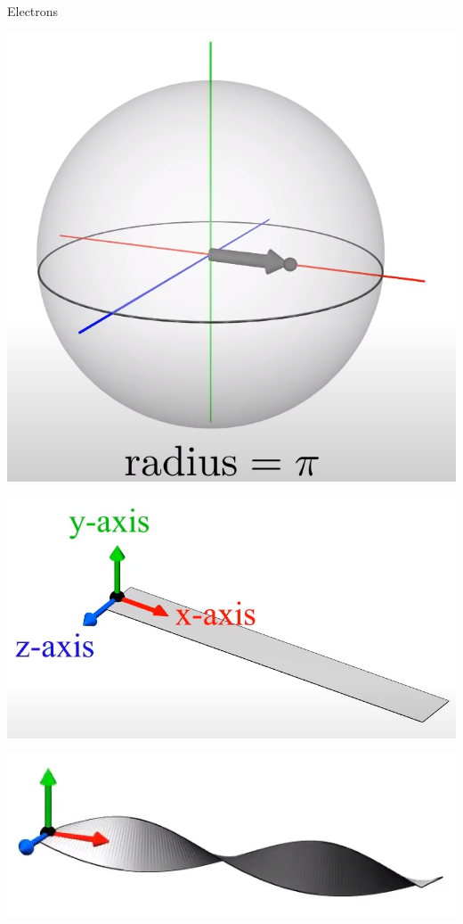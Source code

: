 \documentclass[10pt]{beamer}
\begin{document}

\begin{frame}{Electrons}
\end{frame}

\begin{frame}

    \includegraphics[scale=0.1]{Pictures/SO3sphere.png}

    \includegraphics[scale=0.1]{Pictures/beltaxis.png}

    \includegraphics[scale=0.1]{Pictures/xaxisbelt.png}


\end{frame}
\end{document}
